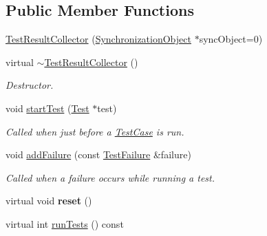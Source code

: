 \subsection*{Public Member Functions}
\begin{DoxyCompactItemize}
\item 
\hyperlink{class_test_result_collector_acd410a45f737152c0e7025db93533f3d}{Test\+Result\+Collector} (\hyperlink{class_synchronized_object_1_1_synchronization_object}{Synchronization\+Object} $\ast$sync\+Object=0)
\item 
\hypertarget{class_test_result_collector_a07415374db592c06402199f6027f773b}{virtual \hyperlink{class_test_result_collector_a07415374db592c06402199f6027f773b}{$\sim$\+Test\+Result\+Collector} ()}\label{class_test_result_collector_a07415374db592c06402199f6027f773b}

\begin{DoxyCompactList}\small\item\em Destructor. \end{DoxyCompactList}\item 
\hypertarget{class_test_result_collector_a647d3e05ffc8fcf7023fea2f7c9f95cb}{void \hyperlink{class_test_result_collector_a647d3e05ffc8fcf7023fea2f7c9f95cb}{start\+Test} (\hyperlink{class_test}{Test} $\ast$test)}\label{class_test_result_collector_a647d3e05ffc8fcf7023fea2f7c9f95cb}

\begin{DoxyCompactList}\small\item\em Called when just before a \hyperlink{class_test_case}{Test\+Case} is run. \end{DoxyCompactList}\item 
void \hyperlink{class_test_result_collector_af53cbc55621f0eb0dc02d8b0203ea321}{add\+Failure} (const \hyperlink{class_test_failure}{Test\+Failure} \&failure)
\begin{DoxyCompactList}\small\item\em Called when a failure occurs while running a test. \end{DoxyCompactList}\item 
\hypertarget{class_test_result_collector_aa5caf327a52b26b3c5c2d70f6aac52dd}{virtual void {\bfseries reset} ()}\label{class_test_result_collector_aa5caf327a52b26b3c5c2d70f6aac52dd}

\item 
\hypertarget{class_test_result_collector_a80406d903bf73568fa8b8154585f1d33}{virtual int \hyperlink{class_test_result_collector_a80406d903bf73568fa8b8154585f1d33}{run\+Tests} () const }\label{class_test_result_collector_a80406d903bf73568fa8b8154585f1d33}


\end{DoxyCompactItemize}
